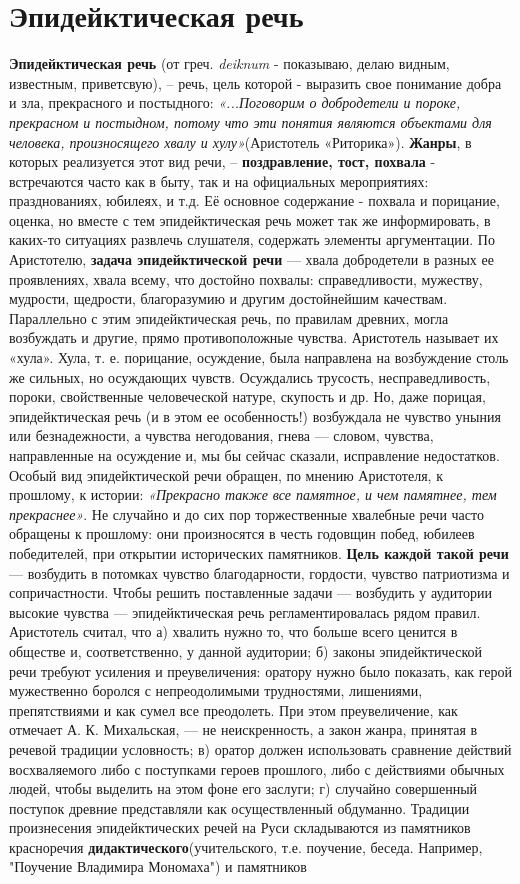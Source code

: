 \section{\textbf{Эпидейктическая речь}}
\textbf{Эпидейктическая речь} (от греч.  \textit{deiknum }- показываю, делаю видным, известным, приветсвую), -- речь, цель которой - выразить свое понимание добра и зла, прекрасного и постыдного:  \textit{«...Поговорим о добродетели и пороке, прекрасном и постыдном, потому что эти понятия являются объектами для человека, произносящего хвалу и хулу»}(Аристотель «Риторика»). \textbf{Жанры}, в которых реализуется этот вид речи, -- \textbf{поздравление, тост, похвала} - встречаются часто как в быту, так и на официальных мероприятиях: празднованиях, юбилеях, и т.д. Её основное содержание - похвала и порицание, оценка, но вместе с тем эпидейктическая речь может так же информировать, в каких-то ситуациях развлечь слушателя, содержать элементы аргументации. По Аристотелю, \textbf{задача эпидейктической речи} — хвала добродетели в разных ее проявлениях, хвала всему, что достойно похвалы: справедливости, мужеству, мудрости, щедрости, благоразумию и другим достойнейшим качествам. Параллельно с этим эпидейктическая речь, по правилам древних, могла возбуждать и другие, прямо противоположные чувства. Аристотель называет их «хула». Хула, т. е. порицание, осуждение, была направлена на возбуждение столь же сильных, но осуждающих чувств. Осуждались трусость, несправедливость, пороки, свойственные человеческой натуре, скупость и др. Но, даже порицая, эпидейктическая речь (и в этом ее особенность!) возбуждала не чувство уныния или безнадежности, а чувства негодования, гнева — словом, чувства, направленные на осуждение и, мы бы сейчас сказали, исправление недостатков. Особый вид эпидейктической речи обращен, по мнению Аристотеля, к прошлому, к истории: \textit{«Прекрасно также все памятное, и чем памятнее, тем прекраснее»}. Не случайно и до сих пор торжественные хвалебные речи часто обращены к прошлому: они произносятся в честь годовщин побед, юбилеев победителей, при открытии исторических памятников.\textbf{ Цель каждой такой речи} — возбудить в потомках чувство благодарности, гордости, чувство патриотизма и сопричастности. Чтобы решить поставленные задачи —  возбудить у аудитории высокие чувства — эпидейктическая речь регламентировалась рядом правил. Аристотель считал, что а) хвалить нужно то, что больше всего ценится в обществе и, соответственно, у данной аудитории; б) законы эпидейктической речи требуют усиления и преувеличения: оратору нужно было показать, как герой мужественно боролся с непреодолимыми трудностями, лишениями, препятствиями и как сумел все преодолеть. При этом преувеличение, как отмечает А. К. Михальская, — не неискренность, а закон жанра, принятая в речевой традиции условность; в) оратор должен использовать сравнение действий восхваляемого либо с поступками героев прошлого, либо с действиями обычных людей, чтобы выделить на этом фоне его заслуги; г) случайно совершенный поступок древние представляли как осуществленный обдуманно. Традиции произнесения эпидейктических речей на Руси складываются из памятников красноречия \textbf{дидактического}(учительского, т.е. поучение, беседа. Например, "Поучение Владимира Мономаха") и памятников 